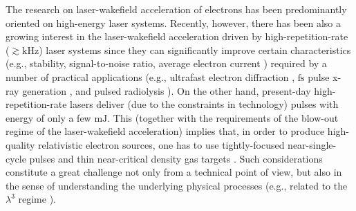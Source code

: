 \documentclass[10pt, a4paper, twoside, openright]{report}
\begin{document}

The research on laser-wakefield acceleration of electrons has been predominantly oriented on high-energy laser systems. Recently, however, there has been also a growing interest in the laser-wakefield acceleration driven by high-repetition-rate ($ \gtrsim \mathrm{kHz} $) laser systems \cite{Salehi2017, Guenot2017, Gustas2018, Salehi2021} since they can significantly improve certain characteristics (e.g., stability, signal-to-noise ratio, average electron current \cite{Faure2018}) required by a number of practical applications (e.g., ultrafast electron diffraction \cite{Sciaini2011, Miller2014}, $ \mathrm{fs} $ pulse x-ray generation \cite{TaPhuoc2012, Corde2013}, and pulsed radiolysis \cite{Muroya2008}). On the other hand, present-day high-repetition-rate lasers deliver (due to the constraints in technology) pulses with energy of only a few $ \mathrm{mJ} $. This (together with the requirements of the blow-out regime of the laser-wakefield acceleration) implies that, in order to produce high-quality relativistic electron sources, one has to use tightly-focused near-single-cycle pulses and thin near-critical density gas targets \cite{Faure2018, Salehi2019}. Such considerations constitute a great challenge not only from a technical point of view, but also in the sense of understanding the underlying physical processes (e.g., related to the $ \lambda^{3} $ regime \cite{Mourou2002, Naumova2004}).
\end{document}
